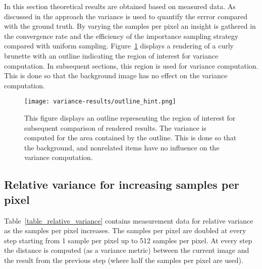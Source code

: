 \documentclass[11pt,a4paper]{report}
\begin{document}
In this section theoretical results are obtained based on measured data. As discussed in the approach the variance is used to quantify the errror compared with the ground truth. By varying the samples per pixel an insight is gathered in the convergence rate and the efficiency of the importance sampling strategy compared with uniform sampling. Figure~\ref{fig_variance_outline} displays a rendering of a curly brunette with an outline indicating the region of interest for variance computation. In subsequent sections, this region is used for variance computation. This is done so that the background image has no effect on the variance computation.

\begin{figure}
\begin{center}
\texttt{[image: variance-results/outline\_hint.png]}
\end{center}
\caption{This figure displays an outline representing the region of interest for subsequent comparison of rendered results. The variance is computed for the area contained by the outline. This is done so that the background, and nonrelated items have no influence on the variance computation.}
\label{fig_variance_outline}
\end{figure}

\subsection{Relative variance for increasing samples per pixel}

Table~\ref{table_relative_variance} contains measurement data for relative variance as the samples per pixel increases. The samples per pixel are doubled at every step starting from 1 sample per pixel up to 512 samples per pixel. At every step the distance is computed (as a variance metric) between the current image and the result from the previous step (where half the samples per pixel are used).
\end{document}
